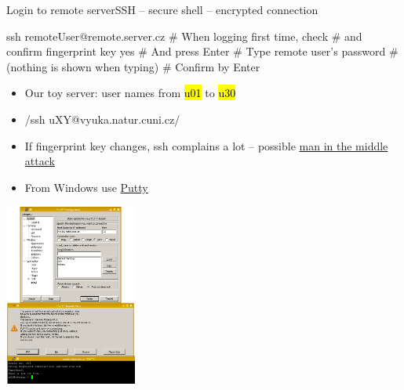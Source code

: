\documentclass[compress, ucs, xelatex, 11pt, xcolor=svgnames,
  hyperref={
    bookmarks=true,
    unicode=true,
    colorlinks=true,
    pdftitle={Linux, command line and MetaCentrum},
    plainpages=false,
    pdfauthor={Vojtech Zeisek},
    pdfsubject={Course about use of Linux command line, writing shell scripts and using MetaCentrum of CESNET},
    pdfcreator={XeLaTeX},
    pdfkeywords={Linux, GNU, BASH, shell, command line, MetaCentrum},
    linkcolor=DarkRed,
    anchorcolor=DarkBlue,
    citecolor=Indigo,
    filecolor=NavyBlue,
    menucolor=DarkMagenta,
    urlcolor=DarkBlue,
    pdftex},
  url={hyphens, lowtilde} %
  ]{beamer}
\renewcommand{\texttt}[1]{\hl{\ttfamily #1}}
\begin{document}
\begin{frame}[fragile]{Login to remote server}{SSH -- secure shell -- encrypted connection}
\begin{multicols}{2}
  \begin{bashcode}
    ssh remoteUser@remote.server.cz
    # When logging first time, check
    # and confirm fingerprint key
    yes # And press Enter
    # Type remote user's password
    # (nothing is shown when typing)
    # Confirm by Enter
  \end{bashcode}
  \begin{itemize}
    \item Our toy server: user names from \texttt{u01} to \texttt{u30}
    \item \bash/ssh uXY@vyuka.natur.cuni.cz/
    \item If fingerprint key changes, ssh complains a lot -- possible \href{https://en.wikipedia.org/wiki/Man-in-the-middle_attack}{man in the middle attack}
    \item From Windows use \href{http://www.putty.org/}{Putty}
  \end{itemize}
  \begin{center}
    \includegraphics[height=6cm]{putty.png}
  \end{center}
\end{multicols}
\end{frame}
\end{document}
